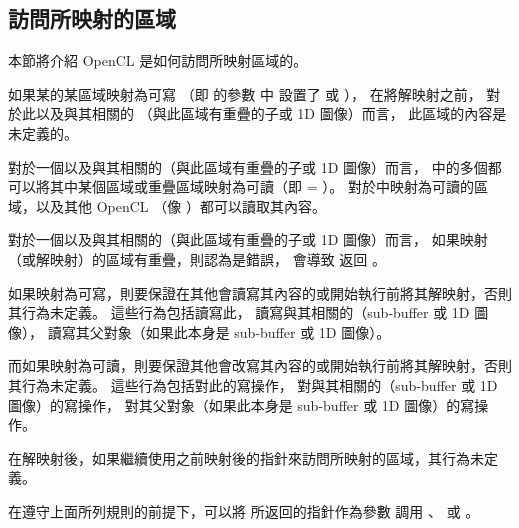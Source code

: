 \subsection{訪問所映射的區域}

本節將介紹 OpenCL 是如何訪問所映射區域的。

如果某的某區域映射為可寫
（即  的參數  中
設置了  或  ），
在將解映射之前，
對於此以及與其相關的
（與此區域有重疊的子或 1D 圖像）而言，
此區域的內容是未定義的。

對於一個以及與其相關的（與此區域有重疊的子或 1D 圖像）而言，
中的多個都可以將其中某個區域或重疊區域映射為可讀（即  = ）。
對於中映射為可讀的區域，以及其他 OpenCL （像  ）都可以讀取其內容。

對於一個以及與其相關的（與此區域有重疊的子或 1D 圖像）而言，
如果映射（或解映射）的區域有重疊，則認為是錯誤，
會導致  返回 。

如果映射為可寫，則要保證在其他會讀寫其內容的或開始執行前將其解映射，否則其行為未定義。
這些行為包括讀寫此，
讀寫與其相關的（sub-buffer 或 1D 圖像），
讀寫其父對象（如果此本身是 sub-buffer 或 1D 圖像）。

而如果映射為可讀，則要保證其他會改寫其內容的或開始執行前將其解映射，否則其行為未定義。
這些行為包括對此的寫操作，
對與其相關的（sub-buffer 或 1D 圖像）的寫操作，
對其父對象（如果此本身是 sub-buffer 或 1D 圖像）的寫操作。

在解映射後，如果繼續使用之前映射後的指針來訪問所映射的區域，其行為未定義。

在遵守上面所列規則的前提下，可以將  所返回的指針作為參數  調用
 、
 或 。

